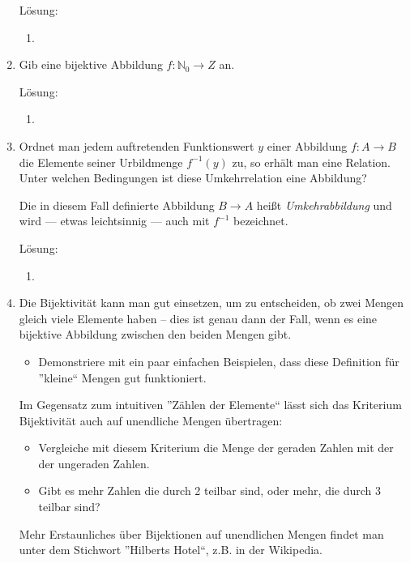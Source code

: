 \documentclass[main.tex]{subfiles}
\begin{document}
\begin{enumerate}
	      Lösung:
	      \begin{enumerate}
		      \item
	      \end{enumerate}
	\item Gib eine bijektive Abbildung \( f: \mathbb{N}_0 \rightarrow Z \) an.

	      Lösung:
	      \begin{enumerate}
		      \item
	      \end{enumerate}
	\item Ordnet man jedem auftretenden Funktionswert \( y \) einer Abbildung  \( f: A \rightarrow B \)
	      die Elemente seiner Urbildmenge \( f^{-1}(y) \) zu, so erhält man eine Relation.
	      Unter welchen Bedingungen ist diese Umkehrrelation eine Abbildung?

	      Die in diesem Fall definierte Abbildung \( B \rightarrow A \) heißt \textit{Umkehrabbildung} und
	      wird — etwas leichtsinnig — auch mit \( f^{-1} \) bezeichnet.

	      Lösung:
	      \begin{enumerate}
		      \item
	      \end{enumerate}
	\item Die Bijektivität kann man gut einsetzen, um zu entscheiden, ob zwei Mengen
	      gleich viele Elemente haben – dies ist genau dann der Fall, wenn es eine
	      bijektive Abbildung zwischen den beiden Mengen gibt.
	      \begin{itemize}
		      \item Demonstriere mit ein paar einfachen Beispielen, dass diese Definition
		            für ”kleine“ Mengen gut funktioniert.
	      \end{itemize}
	      Im Gegensatz zum intuitiven ”Zählen der Elemente“ lässt sich das Kriterium
	      Bijektivität auch auf unendliche Mengen übertragen:
	      \begin{itemize}
		      \item Vergleiche mit diesem Kriterium die Menge der geraden Zahlen mit der
		            der ungeraden Zahlen.
		      \item Gibt es mehr Zahlen die durch 2 teilbar sind, oder mehr, die durch 3
		            teilbar sind?
	      \end{itemize}
	      Mehr Erstaunliches über Bijektionen auf unendlichen Mengen findet man unter dem Stichwort
	      ”Hilberts Hotel“, z.B. in der Wikipedia.


\end{enumerate}
\end{document}

